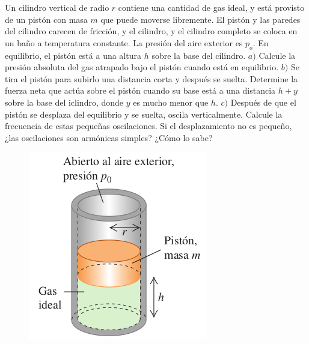 \begin{mdframed}[style=warning]
	\begin{ejercicio}
		Un cilindro vertical de radio $r$ contiene una cantidad de gas ideal, y está provisto de un pistón con masa $m$ que puede moverse libremente. El pistón y las paredes del cilindro carecen de fricción, y el cilindro, y el cilindro completo se coloca en un baño a temperatura constante. La presión del aire exterior es $p_o$. En equilibrio, el pistón está a una altura $h$ sobre la base del cilindro. $a)$ Calcule la presión absoluta del gas atrapado bajo el pistón cuando está en equilibrio. $b)$ Se tira el pistón para subirlo una distancia corta  y después se suelta. Determine la fuerza neta que actúa sobre el pistón cuando su base está a una distancia $h + y$ sobre la base del iclindro, donde $y$ es mucho menor que $h$. $c)$ Después de que el pistón se desplaza del equilibrio y se suelta, oscila verticalmente. Calcule la frecuencia de estas pequeñas oscilaciones. Si el desplazamiento no es pequeño, ¿las oscilaciones son armónicas simples? ¿Cómo lo sabe?
		\begin{figure}[H]
			\centering
			\includegraphics[scale=0.45]{./img/piston.png}
			\label{embolo}
		\end{figure}
	\end{ejercicio}
\end{mdframed}


















